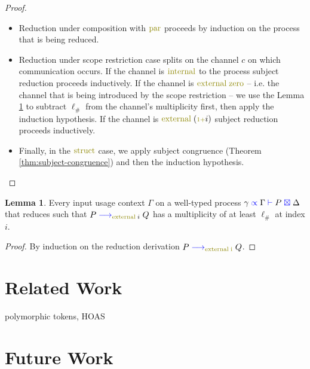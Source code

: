\documentclass[a4paper,UKenglish,cleveref, autoref, thm-restate,authorcolumns]{lipics-v2019}
\theoremstyle{definition}
\newtheorem{nilemma}[theorem]{Lemma}
\newcommand{\type}[1]{\textcolor{blue}{\operatorname{#1}}}
\newcommand{\constr}[1]{\textcolor{olive}{\operatorname{#1}}}
\newcommand{\suc}{\constr{\scriptstyle 1+}}
\newcommand{\lio}{\ell_{\#}}
\newcommand{\reduce}[1]{\; \type{\longrightarrow}_{#1} \;}
\newcommand{\types}[4]{#1 \; \type{\propto} \; #2 \; \type{\vdash} \; #3 \; \type{\boxtimes} \; #4}
\begin{document}
\begin{proof}
\begin{itemize}
    \item
    Reduction under composition with $\constr{par}$ proceeds by induction on the process that is being reduced.

    \item
    Reduction under scope restriction case splits on the channel $c$ on which communication occurs.
    If the channel is $\constr{internal}$ to the process subject reduction proceeds inductively.
    If the channel is $\constr{external}\; \constr{zero}$ -- i.e. the channel that is being introduced by the scope restriction -- we use the Lemma \ref{lm:comm-capable} to subtract $\lio$ from the channel's multiplicity first, then apply the induction hypothesis.
    If the channel is $\constr{external}\; (\suc i)$ subject reduction proceeds inductively.

    \item
    Finally, in the $\constr{struct}$ case, we apply subject congruence (Theorem \ref{thm:subject-congruence}) and then the induction hypothesis.
  \end{itemize}
\end{proof}

\begin{nilemma}
  \label{lm:comm-capable}
  Every input usage context $\Gamma$ on a well-typed process $\types{\gamma}{\Gamma}{P}{\Delta}$ that reduces such that $P \reduce{\constr{external} \; i} Q$ has a multiplicity of at least $\lio$ at index $i$.
\end{nilemma}
\begin{proof}
  By induction on the reduction derivation $P \reduce{\constr{external \; i}}Q$.
\end{proof}

\section{Related Work}

\cite{previous-work} polymorphic tokens, HOAS

\cite{typing-with-leftovers}

\cite{Higher-inductive-types-for-congruence}

\cite{LTS-semantics}

\cite{work-on-session-types}


\section{Future Work}
\end{document}
